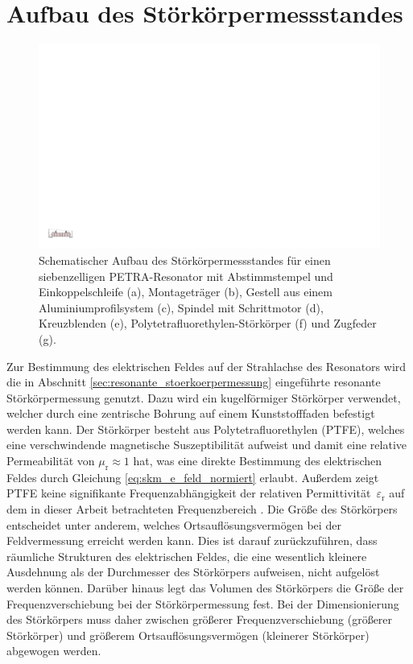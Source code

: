 \section{Aufbau des Störkörpermessstandes}
\label{sec:aufbau_messstand}
\begin{figure}
	\centering
	\includegraphics[width=1.0\textheight]{./figs/cavity/messaufbau.pdf}
	\caption[Schematischer Aufbau des Störkörpermessstandes]{Schematischer Aufbau des Störkörpermessstandes für einen siebenzelligen PETRA-Resonator mit Abstimmstempel und Einkoppelschleife (a), Montageträger (b), Gestell aus einem Aluminiumprofilsystem (c), Spindel mit Schrittmotor (d), Kreuzblenden (e), Polytetrafluorethylen-Störkörper (f) und Zugfeder (g).}
	\label{fig:stoerkoerpermessstand}
\end{figure}
Zur Bestimmung des elektrischen Feldes auf der Strahlachse des Resonators wird die in Abschnitt \ref{sec:resonante_stoerkoerpermessung} eingeführte resonante Störkörpermessung genutzt.
Dazu wird ein kugelförmiger Störkörper verwendet, welcher durch eine zentrische Bohrung auf einem Kunststofffaden befestigt werden kann.
Der Störkörper besteht aus Polytetrafluorethylen (PTFE), welches eine verschwindende magnetische Suszeptibilität aufweist \cite{keyjeff} und damit eine relative Permeabilität von $\mu_\mathrm{r} \approx 1$ hat, was eine direkte Bestimmung des elektrischen Feldes durch Gleichung \eqref{eq:skm_e_feld_normiert} erlaubt.
Außerdem zeigt PTFE keine signifikante Frequenzabhängigkeit der relativen Permittivität~$\varepsilon_\mathrm{r}$ auf dem in dieser Arbeit betrachteten Frequenzbereich \cite[S.\ 2201]{CRC}.
Die Größe des Störkörpers entscheidet unter anderem, welches Ortsauflösungsvermögen bei der Feldvermessung erreicht werden kann.
Dies ist darauf zurückzuführen, dass räumliche Strukturen des elektrischen Feldes, die eine wesentlich kleinere Ausdehnung als der Durchmesser des Störkörpers aufweisen, nicht aufgelöst werden können.
Darüber hinaus legt das Volumen des Störkörpers die Größe der Frequenzverschiebung bei der Störkörpermessung fest.
Bei der Dimensionierung des Störkörpers muss daher zwischen größerer Frequenzverschiebung (größerer Störkörper) und größerem Ortsauflösungsvermögen (kleinerer Störkörper) abgewogen werden.

